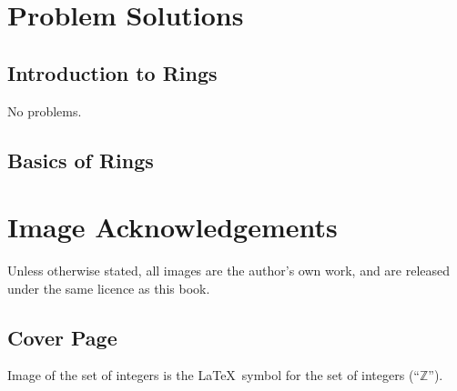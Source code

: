 \chapter{Problem Solutions}
\section{Introduction to Rings}
No problems.

\section{Basics of Rings}

\chapter{Image Acknowledgements}
Unless otherwise stated, all images are the author's own work, and are released under the same licence as this book.

\section{Cover Page}
Image of the set of integers is the \LaTeX\, symbol for the set of integers (``$\mathbb{Z}$'').

\printbibliography[heading=bibintoc, title={References and Bibliography}]
\printindex


